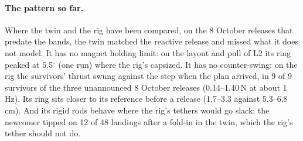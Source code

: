 \paragraph{The pattern so far.} Where the twin and the rig have been compared, on the 8 October releases that
predate the bands, the twin matched the reactive release and missed what it does not model. It has no magnet holding limit: on the layout and pull of L2 its ring peaked at
5.5$^\circ$ (one run) where the rig's capsized. It has no counter-swing: on the rig the survivors' thrust
swung against the step when the plan arrived, in 9 of 9 survivors of the three unannounced 8 October releases
(0.14--1.40\,N at about 1\,Hz). Its ring sits closer
to its reference before a release (1.7--3.3 against 5.3--6.8\,cm). And its rigid rods behave where the rig's tethers
would go slack: the newcomer tipped on 12 of 48 landings after a fold-in in the twin, which the rig's tether should
not do.

